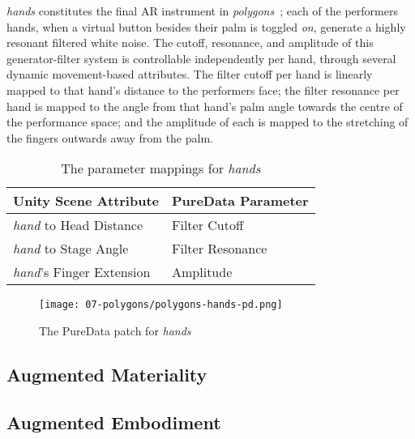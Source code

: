 \textit{hands} constitutes the final AR instrument in \textit{polygons~}; each of the performers hands, when a virtual button besides their palm is toggled \textit{on}, generate a highly resonant filtered white noise. The cutoff, resonance, and amplitude of this generator-filter system is controllable independently per hand, through several dynamic movement-based attributes. The filter cutoff per hand is linearly mapped to that hand's distance to the performers face; the filter resonance per hand is mapped to the angle from that hand's palm angle towards the centre of the performance space; and the amplitude of each is mapped to the stretching of the fingers outwards away from the palm.
\begin{table}
    \centering
    \begin{tabular}{ l|l }
        \textbf{Unity Scene Attribute}         & \textbf{PureData Parameter}    \\
        \hline      
        \textit{hand} to Head Distance         & Filter Cutoff                  \\
        \textit{hand} to Stage Angle           & Filter Resonance               \\
        \textit{hand}'s Finger Extension       & Amplitude               
    \end{tabular}
    \caption{The parameter mappings for \textit{hands}}
    \label{fig: polygons-hands-mapping}
\end{table}
\begin{figure}
    \centering
    \texttt{[image: 07-polygons/polygons-hands-pd.png]}
    \caption{The PureData patch for \textit{hands}}
    \label{fig: polygons-hands-pd}
\end{figure}

\subsection{Augmented Materiality} \label{sec: polygons-composition-material}


\subsection{Augmented Embodiment} \label{sec: polygons-composition-embodiment}



